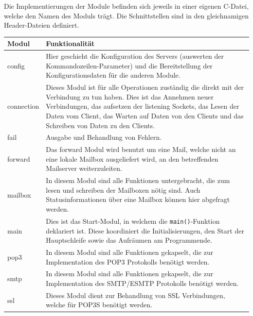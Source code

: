 \documentclass[final,a4paper,11pt,notitlepage,halfparskip]{scrreprt}
\begin{document}
Die Implementierungen der Module befinden sich jeweils in einer eigenen C-Datei,
welche den Namen des Moduls trägt. Die Schnittstellen sind in den gleichnamigen
Header-Dateien definiert.

\vspace{3mm}

\begin{tabular}[h]{lp{30em}}
  Modul       & Funktionalität \\
  \hline\hline
  config      & Hier geschieht die Konfiguration des Servers (auswerten der
                Kommandozeilen-Parameter) und die Bereitstellung der 
		Konfigurationsdaten für die anderen Module.\\
  connection  & Dieses Modul ist für alle Operationen zuständig die direkt mit
                der Verbindung zu tun haben. Dies ist das Annehmen neuer
		Verbindungen, das aufsetzen der listening Sockets, das Lesen der
		Daten vom Client, das Warten auf Daten von den Clients und das
		Schreiben von Daten zu den Clients.\\
  fail        & Ausgabe und Behandlung von Fehlern.\\
  forward     & Das forward Modul wird benutzt um eine Mail, welche nicht an
                eine lokale Mailbox ausgeliefert wird, an den betreffenden
		Mailserver weiterzuleiten.\\
  mailbox     & In diesem Modul sind alle Funktionen untergebracht, die zum
                lesen und schreiben der Mailboxen nötig sind. Auch
		Statusinformationen über eine Mailbox können hier abgefragt
		werden.\\
  main        & Dies ist das Start-Modul, in welchem die 
                \texttt{main()}-Funktion deklariert ist. Diese koordiniert die
		Initialisierungen, den Start der Hauptschleife sowie das
		Aufräumen am Programmende.\\
  pop3        & In diesem Modul sind alle Funktionen gekapselt, die zur
                Implementation des POP3 Protokolls benötigt werden.\\
  smtp        & In diesem Modul sind alle Funktionen gekapselt, die zur
                Implementation des SMTP/ESMTP Protokolls benötigt werden.\\
  ssl         & Dieses Modul dient zur Behandlung von SSL Verbindungen, welche
                für POP3S benötigt werden.\\
  \hline
\end{tabular}
\vspace{3mm}
\end{document}
